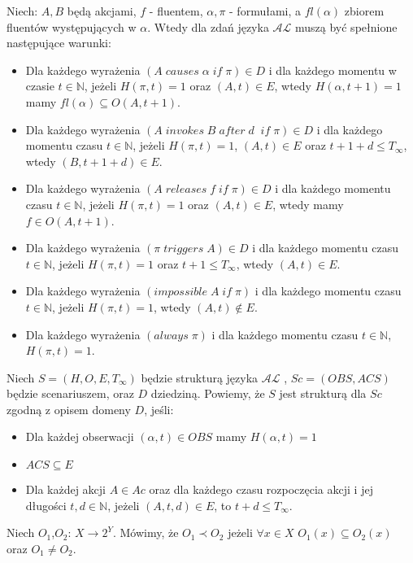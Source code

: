 Niech: $A,B$ będą akcjami, $ f $ - fluentem, $\alpha, \pi$ - formułami, a $fl(\alpha)$ zbiorem fluentów występujących w $\alpha$. Wtedy dla zdań języka $\mathcal{AL}$  muszą być spełnione następujące warunki: 
   \begin{itemize} 
   		\item Dla każdego wyrażenia $ ( A\;causes\;\alpha\;if\;\pi)\in D $ i dla każdego momentu w czasie $t \in \mathbb{N}$, jeżeli $H(\pi,t)=1$ oraz $(A,t) \in E$, wtedy $H(\alpha,t + 1)=1$ mamy $fl(\alpha)\subseteq O(A,t + 1)$.
 		\item Dla każdego wyrażenia $( A\;invokes\;B\;after\;d\;\;if\;\pi)\in D$ i dla każdego momentu czasu $t \in \mathbb{N}$, jeżeli $H(\pi,t)=1$, $(A,t)\in E $ oraz $t+1+d\leq T_{\infty}$, wtedy $(B,t+1+d) \in E $.
   		\item Dla każdego wyrażenia $( A \;releases\;f\;if\;\pi)\in D $ i dla każdego momentu czasu $t \in \mathbb{N}$, jeżeli $H(\pi,t)=1$ oraz $(A,t)\in E$, wtedy mamy $f\in O(A,t+1)$.
   		\item Dla każdego wyrażenia $(\pi\;triggers\; A)\in D$ i dla każdego momentu czasu $t \in \mathbb{N}$, jeżeli $H(\pi,t)=1$ oraz $t+1\leq T_{\infty}$, wtedy $(A,t)\in E$.
		\item Dla każdego wyrażenia $(impossible \; A \; if\;  \pi )$ i dla każdego momentu czasu $t \in \mathbb{N}$, jeżeli $H(\pi,t)=1$, wtedy $(A,t) \notin E $.
		\item Dla każdego wyrażenia $(always \; \pi )$ i dla każdego momentu czasu $t \in \mathbb{N}$, $H(\pi,t)=1$.
   \end{itemize}
   \begin{definition}
   Niech $S = (H,O,E,T_{\infty})$ będzie strukturą języka $\mathcal{AL}$ , $ Sc=(OBS,ACS) $ będzie scenariuszem, oraz $ D $ dziedziną. Powiemy, że $ S $ jest strukturą dla $Sc$ zgodną z opisem domeny $D$, jeśli:
   		\begin{itemize} 
     		\item Dla każdej obserwacji $(\alpha,t )\in OBS$ mamy $H(\alpha,t )=1$
     		\item $ACS \subseteq E$ 
     		\item Dla każdej akcji $ {A \in Ac}$ oraz dla każdego czasu rozpoczęcia akcji i jej długości $t,d \in \mathbb{N}$, jeżeli $(A,t,d) \in E $, to $t+d \leq T_{\infty}$. 
    		\end{itemize} 
   \end{definition}
   \begin{definition}
   Niech $O_{1}$,$O_{2}$: $X \longrightarrow 2^{Y}$. Mówimy, że $O_{1} \prec O_{2}$ jeżeli $\forall x\in X$ $O_{1}(x)\subseteq O_{2}(x)$ oraz $O_{1}\neq O_{2}$.
   \end{definition}
   
